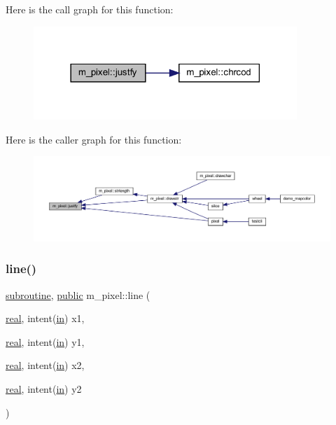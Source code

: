 Here is the call graph for this function\+:
\nopagebreak
\begin{figure}[H]
\begin{center}
\leavevmode
\includegraphics[width=282pt]{namespacem__pixel_a7b08886c913b47694edeb60fa747afc4_cgraph}
\end{center}
\end{figure}
Here is the caller graph for this function\+:
\nopagebreak
\begin{figure}[H]
\begin{center}
\leavevmode
\includegraphics[width=350pt]{namespacem__pixel_a7b08886c913b47694edeb60fa747afc4_icgraph}
\end{center}
\end{figure}
\mbox{\label{namespacem__pixel_a491951b89e60d0d40d67f22d987da894}} 
\subsubsection{\texorpdfstring{line()}{line()}}
{\footnotesize\ttfamily \hyperlink{M__stopwatch_83_8txt_acfbcff50169d691ff02d4a123ed70482}{subroutine}, \hyperlink{M__stopwatch_83_8txt_a2f74811300c361e53b430611a7d1769f}{public} m\+\_\+pixel\+::line (\begin{DoxyParamCaption}\item[{\hyperlink{read__watch_83_8txt_abdb62bde002f38ef75f810d3a905a823}{real}, intent(\hyperlink{M__journal_83_8txt_afce72651d1eed785a2132bee863b2f38}{in})}]{x1,  }\item[{\hyperlink{read__watch_83_8txt_abdb62bde002f38ef75f810d3a905a823}{real}, intent(\hyperlink{M__journal_83_8txt_afce72651d1eed785a2132bee863b2f38}{in})}]{y1,  }\item[{\hyperlink{read__watch_83_8txt_abdb62bde002f38ef75f810d3a905a823}{real}, intent(\hyperlink{M__journal_83_8txt_afce72651d1eed785a2132bee863b2f38}{in})}]{x2,  }\item[{\hyperlink{read__watch_83_8txt_abdb62bde002f38ef75f810d3a905a823}{real}, intent(\hyperlink{M__journal_83_8txt_afce72651d1eed785a2132bee863b2f38}{in})}]{y2 }\end{DoxyParamCaption})}




